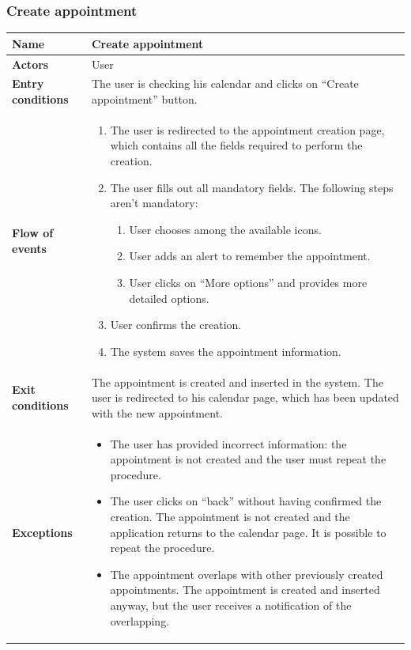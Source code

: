 \subsubsection{Create appointment}
\begin{table}[!h]
	\centering
	{\renewcommand{\arraystretch}{2}%
		\begin{tabular}{|l|p{12cm}|}
			\hline
			\textbf{Name} 				& \textbf{Create appointment} \\ \hline
			\textbf{Actors} 			& User \\ \hline
			\textbf{Entry conditions} 	& The user is checking his calendar and clicks on “Create appointment” button. \\ \hline
			\textbf{Flow of events}		& \begin{minipage}[t]{0.75\textwidth}
				\begin{enumerate}
					\item The user is redirected to the appointment creation page, which contains all the fields required to perform the creation.
					\item The user fills out all mandatory fields.
					The following steps aren’t mandatory:
					\begin{enumerate}
						\item User chooses among the available icons.
						\item User adds an alert to remember the appointment.
						\item User clicks on “More options” and provides more detailed options.
					\end{enumerate}
					\item User confirms the creation.
					\item The system saves the appointment information.
				\end{enumerate}
			\end{minipage}	\\ \hline
			\textbf{Exit conditions}	& The appointment is created and inserted in the system. The user is redirected to his calendar page, which has been updated with the new appointment.  \\ \hline
			\textbf{Exceptions}			& \begin{minipage}[t]{0.75\textwidth}
				\begin{itemize}
					\item The user has provided incorrect information: the appointment is not created and the user must repeat the procedure. 
					\item The user clicks on “back” without having confirmed the creation. The appointment is not created and the application returns to the calendar page. It is possible to repeat the procedure.
					\item The appointment overlaps with other previously created appointments. The appointment is created and inserted anyway, but the user receives a notification of the overlapping.
				\end{itemize} 
			\end{minipage} \\ \hline
	\end{tabular}}
\end{table}
\clearpage


